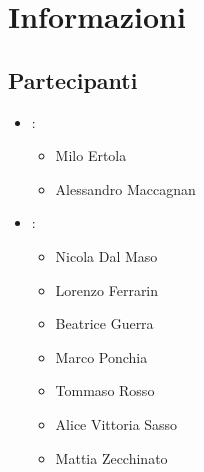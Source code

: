 \section{Informazioni}
\subsection{Partecipanti}

\begin{itemize}
	\item \Proponente:
	\begin{itemize}
		\item Milo Ertola
		\item Alessandro Maccagnan 
	\end{itemize}
	\item \GroupName:
	\begin{itemize}
		\item Nicola Dal Maso
		\item Lorenzo Ferrarin
		\item Beatrice Guerra
		\item Marco Ponchia
		\item Tommaso Rosso
		\item Alice Vittoria Sasso
		\item Mattia Zecchinato
	\end{itemize}
\end{itemize}

\clearpage


